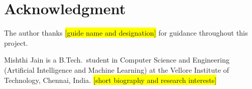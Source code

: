 \documentclass{ieeeaccessapprox}
\newcommand{\todo}[1]{\colorbox{yellow}{[#1]}}
\begin{document}
\section*{Acknowledgment}
The author thanks \todo{guide name and designation} for guidance throughout this project.



\begin{biography}{}{Mishthi Jain}
is a B.Tech.\ student in Computer Science and Engineering (Artificial Intelligence and Machine Learning) at the Vellore Institute of Technology, Chennai, India. \todo{short biography and research interests}
\end{biography}
\EOD
\end{document}
